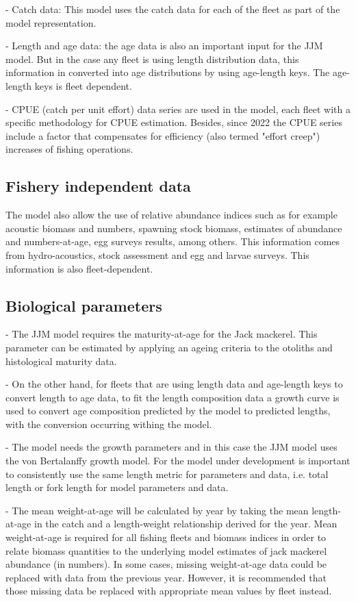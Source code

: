 \documentclass{article}
\begin{document}
- Catch data: This model uses the catch data for each of the fleet as part of the model representation.

- Length and age data: the age data is also an important input for the JJM model. But in the case any fleet is using length distribution data, this information in converted into age distributions by using age-length keys. The age-length keys is fleet dependent.

- CPUE (catch per unit effort) data series are used in the model, each fleet with a specific methodology for CPUE estimation. Besides, since 2022 the CPUE series include a factor that compensates for efficiency (also termed "effort creep") increases of fishing operations.

\subsection{Fishery independent data}

The model also allow the use of relative abundance indices such as for example acoustic biomass and numbers, spawning stock biomass, estimates of abundance and numbers-at-age, egg surveys results, among others. This information comes from hydro-acoustics, stock assessment and egg and larvae surveys. This information is also fleet-dependent.

\subsection{Biological parameters}

- The JJM model requires the maturity-at-age for the Jack mackerel. This parameter can be estimated by applying an ageing criteria to the otoliths and histological maturity data.

- On the other hand, for fleets that are using length data and age-length keys to convert length to age data, to fit the length composition data a growth curve is used to convert age composition predicted by the model to predicted lengths, with the conversion occurring withing the model.

- The model needs the growth parameters and in this case the JJM model uses the von Bertalanffy growth model. For the model under development is important to consistently use the same length metric for parameters and data, i.e. total length or fork length for model parameters and data.

- The mean weight-at-age will be calculated by year by taking the mean length-at-age in the catch and a length-weight relationship derived for the year. Mean weight-at-age is required for all fishing fleets and biomass indices in order to relate biomass quantities to the underlying model estimates of jack mackerel abundance (in numbers). In some cases, missing weight-at-age data could be replaced with data from the previous year. However, it is recommended that those missing data be replaced with appropriate mean values by fleet instead. 
\end{document}

